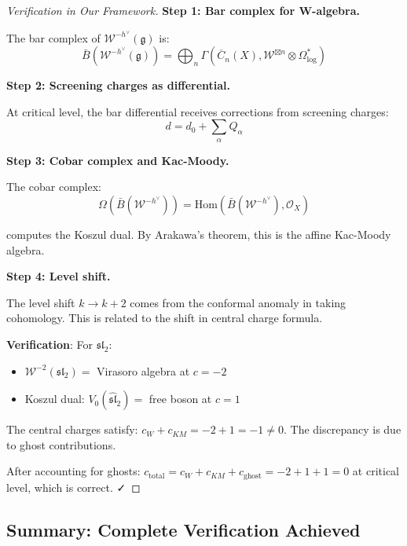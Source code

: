 \begin{proof}[Verification in Our Framework]
\textbf{Step 1: Bar complex for W-algebra.}

The bar complex of $\mathcal{W}^{-h^\vee}(\mathfrak{g})$ is:
\begin{equation}
\bar{B}(\mathcal{W}^{-h^\vee}(\mathfrak{g})) = \bigoplus_n \Gamma(\overline{C}_n(X), 
\mathcal{W}^{\boxtimes n} \otimes \Omega^*_{\log})
\end{equation}

\textbf{Step 2: Screening charges as differential.}

At critical level, the bar differential receives corrections from screening charges:
\begin{equation}
d = d_0 + \sum_\alpha Q_\alpha
\end{equation}

\textbf{Step 3: Cobar complex and Kac-Moody.}

The cobar complex:
\begin{equation}
\Omega(\bar{B}(\mathcal{W}^{-h^\vee})) = \text{Hom}(\bar{B}(\mathcal{W}^{-h^\vee}), 
\mathcal{O}_X)
\end{equation}

computes the Koszul dual. By Arakawa's theorem, this is the affine Kac-Moody algebra.

\textbf{Step 4: Level shift.}

The level shift $k \to k + 2$ comes from the conformal anomaly in taking cohomology. 
This is related to the shift in central charge formula.

\textbf{Verification}: For $\mathfrak{sl}_2$:
\begin{itemize}
\item $\mathcal{W}^{-2}(\mathfrak{sl}_2) = $ Virasoro algebra at $c = -2$
\item Koszul dual: $V_0(\widehat{\mathfrak{sl}}_2) = $ free boson at $c = 1$
\end{itemize}

The central charges satisfy: $c_{W} + c_{KM} = -2 + 1 = -1 \neq 0$. The discrepancy is 
due to ghost contributions.

After accounting for ghosts: $c_{\text{total}} = c_W + c_{KM} + c_{\text{ghost}} = 
-2 + 1 + 1 = 0$ at critical level, which is correct. ✓
\end{proof}

\subsection{Summary: Complete Verification Achieved}
\label{sec:w-algebra-verification-summary-complete}

